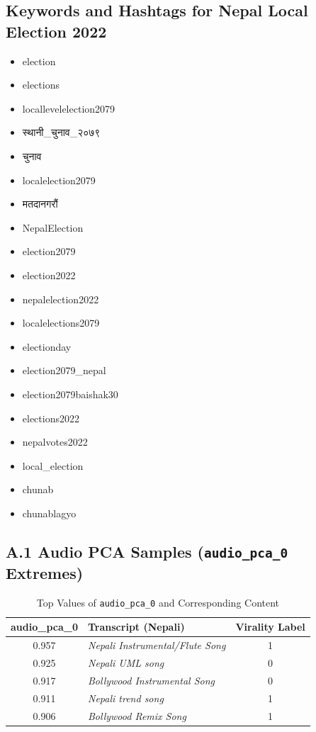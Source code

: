 \documentclass[12pt,a4paper]{report}
\begin{document}
\subsection*{Keywords and Hashtags for Nepal Local Election 2022}
\label{appendix:keywords}
\begin{itemize}
    \item election
    \item elections
    \item locallevelelection2079
    \item \texthindi{स्थानी\_चुनाव\_२०७९}
    \item \texthindi{चुनाव}
    \item localelection2079
    \item \texthindi{मतदानगरौं}
    \item NepalElection
    \item election2079
    \item election2022
    \item nepalelection2022
    \item localelections2079
    \item electionday
    \item election2079\_nepal
    \item election2079baishak30
    \item elections2022
    \item nepalvotes2022
    \item local\_election
    \item chunab
    \item chunablagyo
\end{itemize}

\subsection*{A.1 Audio PCA Samples (\texttt{audio\_pca\_0} Extremes)}

\begin{table}[H]
\centering
\caption{Top Values of \texttt{audio\_pca\_0} and Corresponding Content}
\label{tab:audio_pca_high}
\begin{tabular}{clc}
\toprule
\textbf{audio\_pca\_0} & \textbf{Transcript (Nepali)} & \textbf{Virality Label} \\
\midrule
0.957 & \textit{Nepali Instrumental/Flute Song} & 1 \\
0.925 & \textit{Nepali UML song} & 0 \\
0.917 & \textit{Bollywood Instrumental Song} & 0 \\
0.911 & \textit{Nepali trend song} & 1 \\
0.906 & \textit{Bollywood Remix Song} & 1 \\
\bottomrule
\end{tabular}
\end{table}
\end{document}
